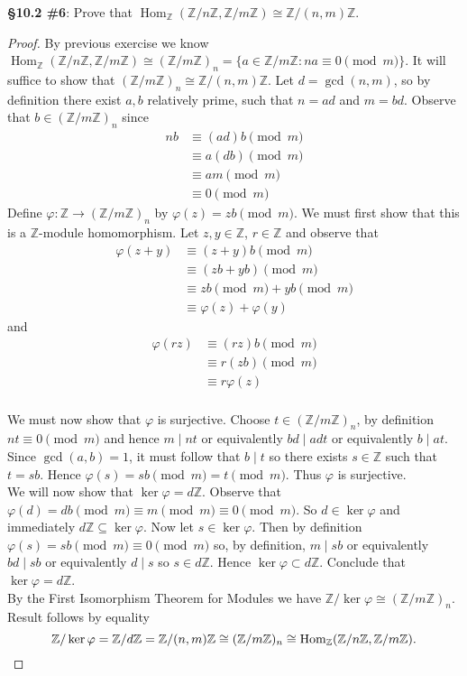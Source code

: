 \documentclass[8pt]{amsart}
\theoremstyle{plain}%
\theoremstyle{definition}
\theoremstyle{remark}
\numberwithin{equation}{section}
\newcommand{\Z}{\mathbb{Z}}
\begin{document}
\textbf{\S 10.2 \#6}: Prove that $\operatorname{Hom}_\Z(\Z/n\Z, \Z/m\Z) \cong \Z/(n, m)\Z$.
	\begin{proof}
		By previous exercise we know $\operatorname{Hom}_\Z(\Z/n\Z, \Z/m\Z) \cong (\Z/m\Z)_n = \{a \in \Z/m\Z : na \equiv 0 \pmod m \}$. It will suffice to show that $(\Z/m\Z)_n \cong \Z/(n, m)\Z$. Let $d = \gcd(n, m)$, so by definition there exist $a, b$ relatively prime, such that $n = ad$ and $m = bd$. Observe that $b \in (\Z/m\Z)_n$ since
		\begin{align*}
			nb &\equiv (ad)b \pmod m\\
			&\equiv a(db) \pmod m\\
			&\equiv am \pmod m\\
			&\equiv 0 \pmod m
		\end{align*}
		Define $\varphi : \Z \to (\Z/m\Z)_n$ by $\varphi(z) = zb \pmod m$. We must first show that this is a $\Z$-module homomorphism. Let $z, y \in \Z$, $r \in \Z$ and observe that
		\begin{align*}
			\varphi(z + y) &\equiv (z + y)b \pmod m\\
			&\equiv (zb + yb) \pmod m\\
			&\equiv zb \pmod m + yb \pmod m\\
			&\equiv \varphi(z) + \varphi(y)
		\end{align*}
		and
		\begin{align*}
			\varphi(rz) &\equiv (rz)b \pmod m\\
			&\equiv r(zb)\pmod m\\
			&\equiv r \varphi(z)\\
		\end{align*}

		We must now show that $\varphi$ is surjective. Choose $t \in (\Z/m\Z)_n$, by definition $nt \equiv 0 \pmod m$ and hence $m \mid nt$ or equivalently $bd \mid adt$ or equivalently $b \mid at$. Since $\gcd(a, b) = 1$, it must follow that $b \mid t$ so there exists $s \in \Z$ such that $t = sb$. Hence $\varphi(s) = sb \pmod m = t \pmod m$. Thus $\varphi$ is surjective. \\

		We will now show that $\ker \varphi = d\Z$. Observe that $\varphi(d) = db \pmod m \equiv m \pmod m \equiv 0 \pmod m$. So $d \in \ker \varphi$ and immediately $d\Z \subseteq \ker \varphi$. Now let $s \in \ker \varphi$. Then by definition $\varphi(s) = sb \pmod m \equiv 0 \pmod m$ so, by definition, $m \mid sb$ or equivalently $bd \mid sb$ or equivalently $d \mid s$ so $s \in d\Z$. Hence $\ker\varphi \subset d\Z$. Conclude that $\ker\varphi = d\Z$.\\

		By the First Isomorphism Theorem for Modules we have $\Z/\ker\varphi \cong (\Z/m\Z)_n$. Result follows by equality  $$\Z/\ker \varphi = \Z/d\Z = \Z/(n, m)\Z \cong (\Z/m\Z)_n \cong \operatorname{Hom}_\Z(\Z/n\Z, \Z/m\Z).\qedhere$$

	\end{proof}
\end{document}
